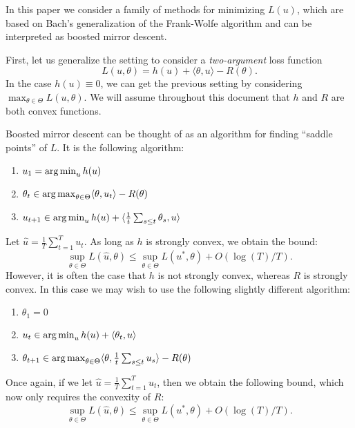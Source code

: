 \documentclass{article}
\begin{document}
In this paper we consider a family of methods for minimizing $L(u)$, 
which are based on Bach's generalization of the Frank-Wolfe algorithm and can 
be interpreted as boosted mirror descent.

First, let us generalize the setting 
to consider a \emph{two-argument} loss function
\[ L(u,\theta) = h(u) + \langle \theta, u \rangle - R(\theta). \]
In the case $h(u) \equiv 0$, we can get the previous setting by 
considering $\max_{\theta \in \Theta} L(u,\theta)$. We will assume 
throughout this document that $h$ and $R$ are both convex functions. 

Boosted mirror descent can be thought of as an algorithm for finding 
``saddle points'' of $L$. It is the following algorithm:
\begin{enumerate}
\item $u_1 = \argmin_{u} h(u)$
\item $\theta_{t} \in \argmax_{\theta \in \Theta} \langle \theta, u_t \rangle - R(\theta)$
\item $u_{t+1} \in \argmin_{u} h(u) + \langle \frac{1}{t} \sum_{s \leq t} \theta_s, u \rangle$
\end{enumerate}
Let $\hat{u} = \frac{1}{T} \sum_{t = 1}^{T} u_t$. As long as $h$ is strongly convex, we obtain the 
bound:
\[ \sup_{\theta \in \Theta} L(\hat{u}, \theta) \leq \sup_{\theta \in \Theta} L(u^*, \theta) + O(\log(T)/T). \]
However, it is often the case that $h$ is not strongly convex, whereas $R$ is strongly convex. In this case 
we may wish to use the following slightly different algorithm:
\begin{enumerate}
\item $\theta_1 = 0$
\item $u_t \in \argmin_{u} h(u) + \langle \theta_t, u \rangle$
\item $\theta_{t+1} \in \argmax_{\theta \in \Theta} \langle \theta, \frac{1}{t} \sum_{s \leq t} u_s \rangle - R(\theta)$
\end{enumerate}
Once again, if we let $\hat{u} = \frac{1}{T} \sum_{t=1}^T u_t$, then we obtain the following bound, which now 
only requires the convexity of $R$:
\[ \sup_{\theta \in \Theta} L(\hat{u}, \theta) \leq \sup_{\theta \in \Theta} L(u^*, \theta) + O(\log(T)/T). \]
\end{document}
